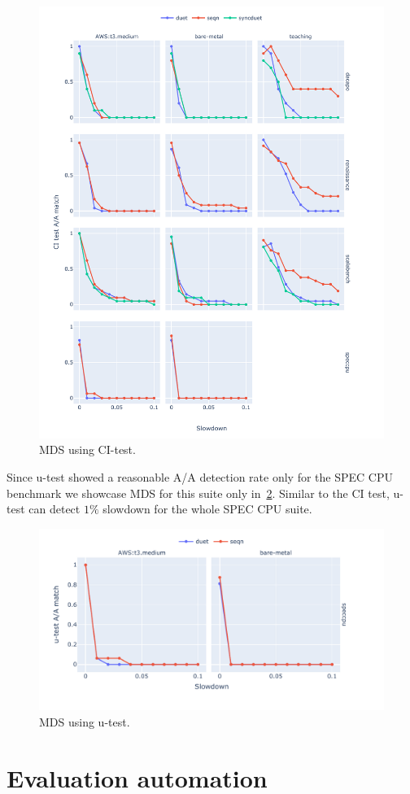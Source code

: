 \begin{figure}
	\centering
	\includegraphics[width=1\linewidth]{./figures/mds_citest.pdf}
	\caption{
    MDS using CI-test.
	}
	\label{fig:mds_citest}
\end{figure}

Since \mbox{u-test} showed a reasonable A/A detection rate only for the SPEC CPU benchmark we showcase MDS for this suite only in~\cref{fig:mds_utest}.
Similar to the CI test, \mbox{u-test} can detect $1\%$ slowdown for the whole SPEC CPU suite.

\begin{figure}
	\centering
	\includegraphics[width=1\linewidth]{./figures/mds_utest.pdf}
	\caption{
    MDS using \mbox{u-test}.
	}
	\label{fig:mds_utest}
\end{figure}

\section{Evaluation automation}
\label{sec:automation}

